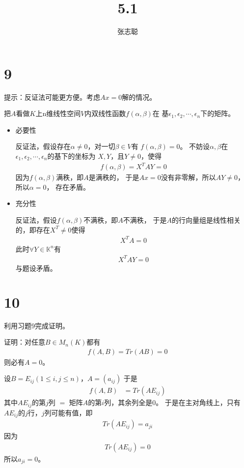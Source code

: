 \documentclass{article}
\begin{document}
\title{5.1}
\author{张志聪}
\maketitle

\section*{9}

提示：反证法可能更方便。考虑$Ax = 0$解的情况。

把$A$看做$K$上n维线性空间$V$内双线性函数$f(\alpha, \beta)$在
基$\epsilon_1, \epsilon_2, \cdots, \epsilon_n$下的矩阵。

\begin{itemize}
  \item 必要性

        反证法，假设存在$\alpha \neq 0$，对一切$\beta \in V$有
        $f(\alpha, \beta) = 0$。
        不妨设$\alpha, \beta$在$\epsilon_1, \epsilon_2, \cdots, \epsilon_n$的基下的坐标为
        $X, Y$，且$Y \neq 0$，使得
        \begin{align*}
          f(\alpha, \beta) = X^T A Y = 0
        \end{align*}
        因为$f(\alpha, \beta)$满秩，即$A$是满秩的，
        于是$Ax = 0$没有非零解，所以$A Y \neq 0$，
        所以$\alpha = 0$，
        存在矛盾。

  \item 充分性

        反证法，假设$f(\alpha, \beta)$不满秩，即$A$不满秩，
        于是$A$的行向量组是线性相关的，即存在$X^T \neq 0$使得
        \begin{align*}
          X^T A = 0
        \end{align*}
        此时$\forall Y \in \mathbb{K}^n$有
        \begin{align*}
          X^T A Y = 0
        \end{align*}
        与题设矛盾。
\end{itemize}

\section*{10}

利用习题9完成证明。

证明：对任意$B \in M_n(K)$都有
\begin{align*}
  f(A, B) = Tr(AB) = 0
\end{align*}
则必有$A = 0$。

设$B = E_{ij} (1 \leq i, j \leq n)$，$A = (a_{ij})$
于是
\begin{align*}
  f(A, B) & = Tr(A E_{ij})
\end{align*}
其中$A E_{ij}$的第$j$列 $ = $ 矩阵$A$的第$i$列，其余列全是0。
于是在主对角线上，只有$A E_{ij}$的$j$行，$j$列可能有值，即
\begin{align*}
  Tr(A E_{ij}) = a_{ji}
\end{align*}
因为
\begin{align*}
  Tr(A E_{ij}) = 0
\end{align*}
所以$a_{ji} = 0$。
\end{document}
